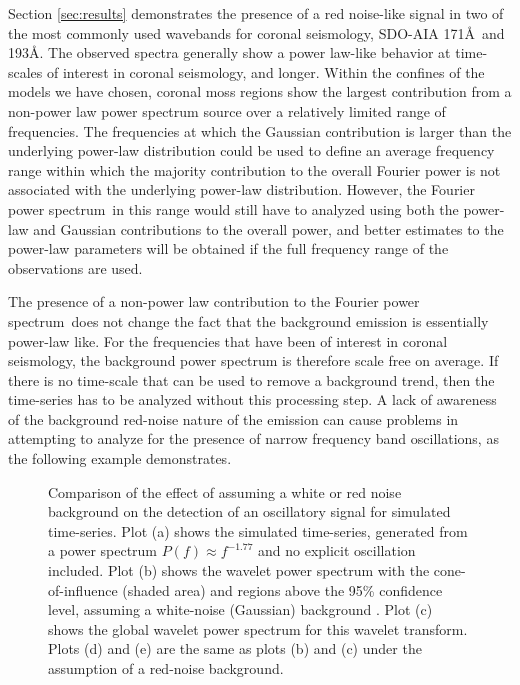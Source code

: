 \documentclass[manuscript]{../aastex52/aastex}
\newcommand{\Fps}{Fourier power spectrum}
\begin{document}
Section \ref{sec:results} demonstrates the presence of a red
noise-like signal in two of the most commonly used wavebands for
coronal seismology, SDO-AIA 171\AA\ and 193\AA.  The observed spectra
generally show a power law-like behavior at time-scales of interest in
coronal seismology, and longer.  Within the confines of the models we
have chosen, coronal moss regions show the largest contribution from a
non-power law power spectrum source over a relatively limited range of
frequencies.  The frequencies at which the Gaussian contribution is
larger than the underlying power-law distribution could be used to
define an average frequency range within which the majority
contribution to the overall Fourier power is not associated with the
underlying power-law distribution.  However, the \Fps\ in this range
would still have to analyzed using both the power-law and Gaussian
contributions to the overall power, and better estimates to the
power-law parameters will be obtained if the full frequency range of
the observations are used.

The presence of a non-power law contribution to the \Fps\ does not
change the fact that the background emission is essentially power-law
like.  For the frequencies that have been of interest in coronal
seismology, the background power spectrum is therefore scale free on
average.  If there is no time-scale that can be used to remove a
background trend, then the time-series has to be analyzed without this
processing step.  A lack of awareness of the background red-noise
nature of the emission can cause problems in attempting to analyze for
the presence of narrow frequency band oscillations, as the following
example demonstrates.

\begin{figure}
\caption{Comparison of the effect of assuming a white or red noise
  background on the detection of an oscillatory signal for simulated
  time-series.  Plot (a) shows the simulated time-series, generated
  from a power spectrum \protect$P(f)\approx f^{-1.77}$ and no
  explicit oscillation included.  Plot (b) shows the wavelet power
  spectrum with the cone-of-influence (shaded area) and regions above
  the 95\% confidence level, assuming a white-noise (Gaussian)
 background .  Plot (c) shows the global wavelet power spectrum for
  this wavelet transform.  Plots (d) and (e) are the same as plots (b)
  and (c) under the assumption of a red-noise background.\label{fig:comparison}}
\end{figure}
\end{document}
